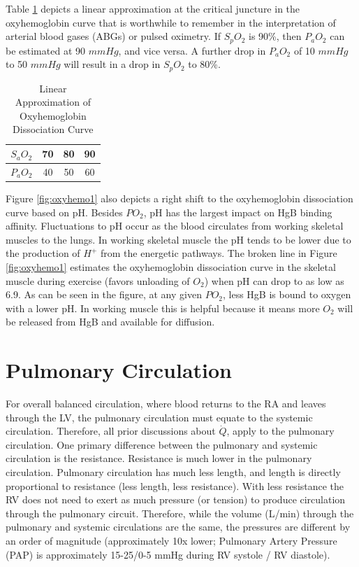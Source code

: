 Table \ref{table:oxyhemo} depicts a linear approximation at the critical juncture in the oxyhemoglobin curve that is worthwhile to remember in the interpretation of arterial blood gases (ABGs) or pulsed oximetry. If $S_pO_2$ is 90\%, then $P_aO_2$ can be estimated at 90 $mmHg$, and vice versa. A further drop in $P_aO_2$ of 10 $mmHg$ to 50 $mmHg$ will result in a drop in $S_pO_2$ to 80\%.

\begin{table}[h!]
\centering
\begin{tabular}{||c|c|c|c||} 
 \hline
 $S_aO_2$ & 70 & 80 & 90 \\ 
 \hline
 $P_aO_2$ & 40 & 50 & 60 \\[1ex] 
 \hline
\end{tabular}
\caption{Linear Approximation of Oxyhemoglobin Dissociation Curve}
\label{table:oxyhemo}
\end{table}

Figure \ref{fig:oxyhemo1} also depicts a right shift to the oxyhemoglobin dissociation curve based on pH. Besides $PO_2$, pH has the largest impact on HgB binding affinity. Fluctuations to pH occur as the blood circulates from working skeletal muscles to the lungs. In working skeletal muscle the pH tends to be lower due to the production of $H^+$ from the energetic pathways. The broken line in Figure \ref{fig:oxyhemo1} estimates the oxyhemoglobin dissociation curve in the skeletal muscle during exercise (favors unloading of $O_2$) when pH can drop to as low as 6.9. As can be seen in the figure, at any given $PO_2$, less HgB is bound to oxygen with a lower pH. In working muscle this is helpful because it means more $O_2$ will be released from HgB and available for diffusion.


\section{Pulmonary Circulation}

For overall balanced circulation, where blood returns to the RA and leaves through the LV, the pulmonary circulation must equate to the systemic circulation. Therefore, all prior discussions about $\dot{Q}$, apply to the pulmonary circulation. One primary difference between the pulmonary and systemic circulation is the resistance. Resistance is much lower in the pulmonary circulation. Pulmonary circulation has much less length, and length is directly proportional to resistance (less length, less resistance). With less resistance the RV does not need to exert as much pressure (or tension) to produce circulation through the pulmonary circuit. Therefore, while the volume (L/min) through the pulmonary and systemic circulations are the same, the pressures are different by an order of magnitude (approximately 10x lower; Pulmonary Artery Pressure (PAP) is approximately 15-25/0-5 mmHg during RV systole / RV diastole).

